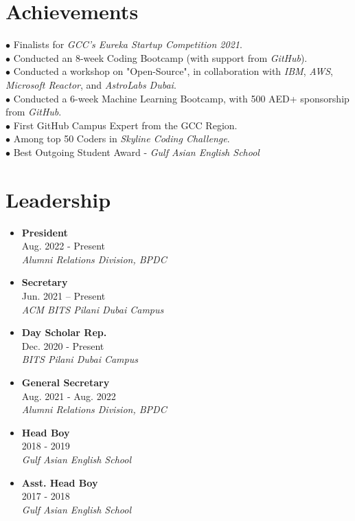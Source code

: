 \documentclass[a4paper,11pt]{article}
\newcommand{\resumeLeadership}[3]{
  \item
      \textbf{#1}\\#2 \\
      \textit{\small#3}\\

}
\begin{document}
\vspace{-1mm}

\section{Achievements}

\vspace{1mm}

\small{

{$\bullet$ Finalists for \textit{GCC’s Eureka Startup Competition 2021}.}\\
\vspace{1mm}
{$\bullet$ Conducted an 8-week Coding Bootcamp (with support from \textit{GitHub}).}\\
\vspace{1mm}
{$\bullet$ Conducted a workshop on "Open-Source", in collaboration with \textit{IBM}, \textit{AWS}, \textit{Microsoft Reactor}, and \textit{AstroLabs Dubai}.}\\
\vspace{1mm}
{$\bullet$ Conducted a 6-week Machine Learning Bootcamp, with 500 AED+ sponsorship from \textit{GitHub}.}\\
\vspace{1mm}
{$\bullet$ First GitHub Campus Expert from the GCC Region.}\\
\vspace{1mm}
{$\bullet$ Among top 50 Coders in \textit{Skyline Coding Challenge}.}\\
\vspace{1mm}
{$\bullet$ Best Outgoing Student Award - \textit{Gulf Asian English School}}\\
\vspace{1mm}

}

\vspace{-2.5mm}


\section{Leadership}

\vspace{-10pt}

\begin{multicols}{2}
	\begin{itemize}
		\resumeLeadership{President}{Aug. 2022 - Present}{Alumni Relations Division, BPDC}
		\resumeLeadership{Secretary}{Jun. 2021 – Present}{ACM BITS Pilani Dubai Campus}
		\resumeLeadership{Day Scholar Rep.}{Dec. 2020 - Present}{BITS Pilani Dubai Campus}
		\resumeLeadership{General Secretary}{Aug. 2021 - Aug. 2022}{Alumni Relations Division, BPDC}
		\resumeLeadership{Head Boy}{2018 - 2019}{Gulf Asian English School}
		\resumeLeadership{Asst. Head Boy}{2017 - 2018}{Gulf Asian English School}
	\end{itemize}
\end{multicols}
\end{document}
